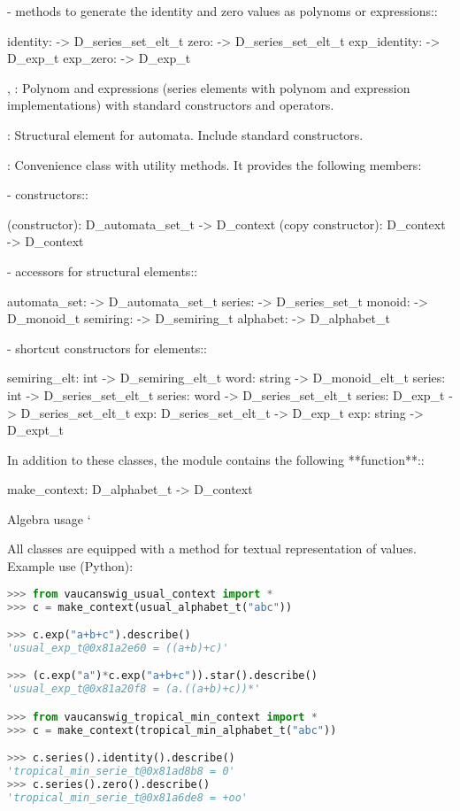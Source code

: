       - methods to  generate the identity and zero  values as polynoms
        or expressions::

          identity: -> D\_series\_set\_elt\_t
          zero: -> D\_series\_set\_elt\_t
          exp\_identity: -> D\_exp\_t
          exp\_zero: -> D\_exp\_t

, :
      Polynom  and  expressions  (series  elements  with  polynom  and
      expression implementations) with standard \Vauc constructors
      and operators.

:
      Structural  element  for  automata. Include  standard  \Vauc
      constructors.

:
      Convenience  class   with  utility  methods.   It  provides  the
      following members:

      - constructors::

         (constructor): D\_automata\_set\_t -> D\_context
         (copy constructor): D\_context -> D\_context

      - accessors for structural elements::

         automata\_set: -> D\_automata\_set\_t
         series: -> D\_series\_set\_t
         monoid: -> D\_monoid\_t
         semiring: -> D\_semiring\_t
         alphabet: -> D\_alphabet\_t

      - shortcut constructors for elements::

         semiring\_elt: int -> D\_semiring\_elt\_t
         word: string -> D\_monoid\_elt\_t
         series: int -> D\_series\_set\_elt\_t
         series: word -> D\_series\_set\_elt\_t
         series: D\_exp\_t -> D\_series\_set\_elt\_t
         exp: D\_series\_set\_elt\_t -> D\_exp\_t
         exp: string -> D\_expt\_t

In  addition  to these  classes,  the module  
contains the following **function**::

    make\_context: D\_alphabet\_t -> D\_context

Algebra usage
\code{}\code{}\code{}`

All classes are equipped with a  method for
textual representation of values. Example use (Python):

\begin{lstlisting}[language=Python]
>>> from vaucanswig_usual_context import *
>>> c = make_context(usual_alphabet_t("abc"))

>>> c.exp("a+b+c").describe()
'usual_exp_t@0x81a2e60 = ((a+b)+c)'

>>> (c.exp("a")*c.exp("a+b+c")).star().describe()
'usual_exp_t@0x81a20f8 = (a.((a+b)+c))*'

>>> from vaucanswig_tropical_min_context import *
>>> c = make_context(tropical_min_alphabet_t("abc"))

>>> c.series().identity().describe()
'tropical_min_serie_t@0x81ad8b8 = 0'
>>> c.series().zero().describe()
'tropical_min_serie_t@0x81a6de8 = +oo'
\end{lstlisting}

